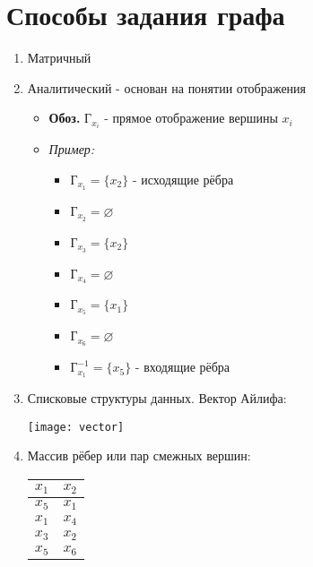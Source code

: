 \documentclass[10pt]{article}
\begin{document}
\section*{Способы задания графа}
\begin{enumerate}
    \item Матричный
    \item Аналитический - основан на понятии отображения
        \begin{itemize}
            \item \par\textbf{Обоз.}  $\text{Г}_{x_{i}}$ - прямое отображение вершины $x_i$
            \item \textit{Пример:}
                \begin{itemize}
                    \item $\text{Г}_{x_{1}} = \{ x_{2} \}$ - исходящие рёбра
                    \item $\text{Г}_{x_{2}} = \varnothing$
                    \item $\text{Г}_{x_{3}} = \{ x_{2} \}$
                    \item $\text{Г}_{x_{4}} = \varnothing$
                    \item $\text{Г}_{x_{5}} = \{ x_{1} \}$
                    \item $\text{Г}_{x_{6}} = \varnothing$
                    \item $\text{Г}^{-1}_{x_{1}} = \{ x_{5} \}$ - входящие рёбра
                \end{itemize}
        \end{itemize}
    \item Списковые структуры данных. Вектор Айлифа:
        \begin{center}
            \texttt{[image: vector]}
        \end{center}
    \item Массив рёбер или пар смежных вершин:
        \par\begin{tabular}{|c|c|}
            \hline
            $x_{1}$ & $x_{2}$ \\
            \hline
            $x_{5}$ & $x_{1}$ \\
            \hline
            $x_{1}$ & $x_{4}$ \\
            \hline
            $x_{3}$ & $x_{2}$ \\
            \hline
            $x_{5}$ & $x_{6}$ \\
            \hline
        \end{tabular}
\end{enumerate}
\end{document}
